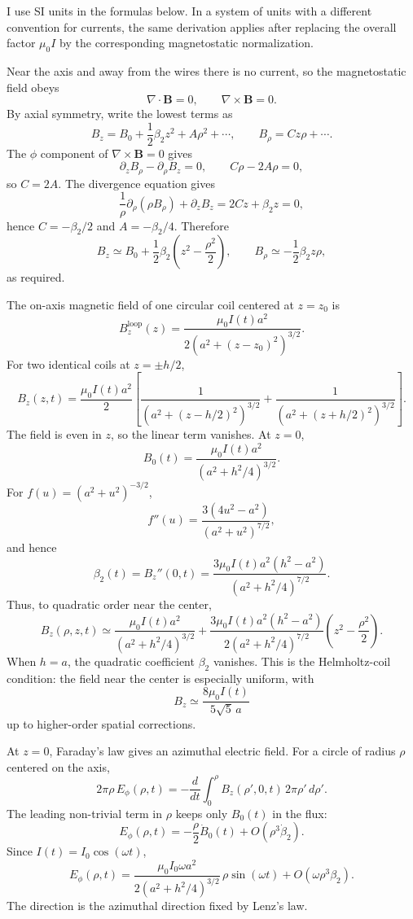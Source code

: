 \begin{solution}
I use SI units in the formulas below. In a system of units with a different convention for currents, the same derivation applies after replacing the overall factor $\mu_0 I$ by the corresponding magnetostatic normalization.

Near the axis and away from the wires there is no current, so the magnetostatic field obeys
\[
    \nabla\cdot\mathbf B=0,\qquad \nabla\times\mathbf B=0 .
\]
By axial symmetry, write the lowest terms as
\[
    B_z=B_0+\frac{1}{2}\beta_2 z^2+A\rho^2+\cdots,
    \qquad
    B_\rho=Cz\rho+\cdots .
\]
The $\phi$ component of $\nabla\times\mathbf B=0$ gives
\[
    \partial_zB_\rho-\partial_\rho B_z=0,
    \qquad
    C\rho-2A\rho=0,
\]
so $C=2A$. The divergence equation gives
\[
    \frac{1}{\rho}\partial_\rho(\rho B_\rho)+\partial_zB_z
    =2Cz+\beta_2z=0,
\]
hence $C=-\beta_2/2$ and $A=-\beta_2/4$. Therefore
\[
    B_z\simeq B_0+\frac{1}{2}\beta_2\left(z^2-\frac{\rho^2}{2}\right),
    \qquad
    B_\rho\simeq -\frac{1}{2}\beta_2z\rho,
\]
as required.

The on-axis magnetic field of one circular coil centered at $z=z_0$ is
\[
    B_z^{\mathrm{loop}}(z)
    =\frac{\mu_0 I(t)a^2}{2\left(a^2+(z-z_0)^2\right)^{3/2}} .
\]
For two identical coils at $z=\pm h/2$,
\[
    B_z(z,t)
    =\frac{\mu_0 I(t)a^2}{2}
    \left[
      \frac{1}{\left(a^2+(z-h/2)^2\right)^{3/2}}
      +\frac{1}{\left(a^2+(z+h/2)^2\right)^{3/2}}
    \right].
\]
The field is even in $z$, so the linear term vanishes. At $z=0$,
\[
    B_0(t)=\frac{\mu_0 I(t)a^2}{\left(a^2+h^2/4\right)^{3/2}}.
\]
For $f(u)=(a^2+u^2)^{-3/2}$,
\[
    f''(u)=\frac{3(4u^2-a^2)}{(a^2+u^2)^{7/2}},
\]
and hence
\[
    \beta_2(t)=B_z''(0,t)
    =\frac{3\mu_0 I(t)a^2(h^2-a^2)}{\left(a^2+h^2/4\right)^{7/2}} .
\]
Thus, to quadratic order near the center,
\[
    B_z(\rho,z,t)
    \simeq
    \frac{\mu_0 I(t)a^2}{\left(a^2+h^2/4\right)^{3/2}}
    +\frac{3\mu_0 I(t)a^2(h^2-a^2)}{2\left(a^2+h^2/4\right)^{7/2}}
       \left(z^2-\frac{\rho^2}{2}\right).
\]
When $h=a$, the quadratic coefficient $\beta_2$ vanishes. This is the Helmholtz-coil condition: the field near the center is especially uniform, with
\[
    B_z\simeq \frac{8\mu_0 I(t)}{5\sqrt{5}\,a}
\]
up to higher-order spatial corrections.

At $z=0$, Faraday's law gives an azimuthal electric field. For a circle of radius $\rho$ centered on the axis,
\[
    2\pi\rho\,E_\phi(\rho,t)
    =-\frac{d}{dt}\int_0^\rho B_z(\rho',0,t)\,2\pi\rho'\,d\rho' .
\]
The leading non-trivial term in $\rho$ keeps only $B_0(t)$ in the flux:
\[
    E_\phi(\rho,t)
    =-\frac{\rho}{2}\dot B_0(t)+O(\rho^3\dot\beta_2).
\]
Since $I(t)=I_0\cos(\omega t)$,
\[
    E_\phi(\rho,t)
    =
    \frac{\mu_0 I_0\omega a^2}{2\left(a^2+h^2/4\right)^{3/2}}\,
    \rho\sin(\omega t)
    +O(\omega\rho^3\beta_2).
\]
The direction is the azimuthal direction fixed by Lenz's law.


\end{solution}
